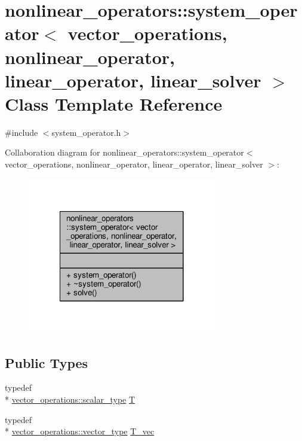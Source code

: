 \hypertarget{classnonlinear__operators_1_1system__operator}{\section{nonlinear\-\_\-operators\-:\-:system\-\_\-operator$<$ vector\-\_\-operations, nonlinear\-\_\-operator, linear\-\_\-operator, linear\-\_\-solver $>$ Class Template Reference}
\label{classnonlinear__operators_1_1system__operator}
}


{\ttfamily \#include $<$system\-\_\-operator.\-h$>$}



Collaboration diagram for nonlinear\-\_\-operators\-:\-:system\-\_\-operator$<$ vector\-\_\-operations, nonlinear\-\_\-operator, linear\-\_\-operator, linear\-\_\-solver $>$\-:\nopagebreak
\begin{figure}[H]
\begin{center}
\leavevmode
\includegraphics[width=234pt]{classnonlinear__operators_1_1system__operator__coll__graph}
\end{center}
\end{figure}
\subsection*{Public Types}
\begin{DoxyCompactItemize}
\item 
typedef \\*
\hyperlink{structcpu__vector__operations_aca6b216aa1fb172df83d98350e94fd61}{vector\-\_\-operations\-::scalar\-\_\-type} \hyperlink{classnonlinear__operators_1_1system__operator_ace913d6e3749a1c318f2e3654e9f570e}{T}
\item 
typedef \\*
\hyperlink{structcpu__vector__operations_a1962836df596ce262704d208e9a6d8f9}{vector\-\_\-operations\-::vector\-\_\-type} \hyperlink{classnonlinear__operators_1_1system__operator_a87719a3fbcb842cc1f8305c59e17cbae}{T\-\_\-vec}
\end{DoxyCompactItemize}
